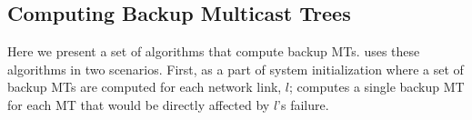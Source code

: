


























\subsection{Computing Backup Multicast Trees}
 \label{subsec:repair}


Here we present a set of algorithms that compute backup MTs.  \mdr uses these algorithms in two scenarios. First, as a part of system initialization 
where a set of backup MTs are computed for each network link, $l$; \mdr computes a single backup MT for each MT that would be directly affected by $l$'s failure. 

